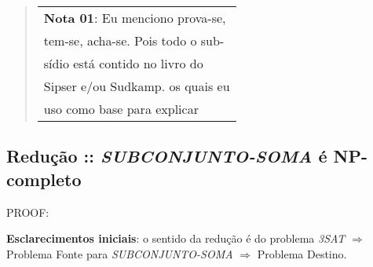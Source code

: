 \documentclass[12pt, a4paper]{article}
\begin{document}
\begin{quote}
  \flushright
    \begin{tabular}{|l}
    \textbf{Nota 01}: Eu menciono prova-se,\\
    tem-se, acha-se. Pois todo o sub-\\
    sídio está contido no livro do\\
    Sipser e/ou Sudkamp. os quais eu\\
    uso como base para explicar\\
  \end{tabular}
\end{quote}

\pagebreak
\subsection{Redução :: \textit{SUBCONJUNTO-SOMA} é \textbf{NP-completo}}

\begin{center}\begin{Huge}PROOF:\end{Huge}\end{center}

\textbf{Esclarecimentos iniciais}: o sentido da redução é do problema \textit{3SAT} $\Rightarrow$ Problema Fonte para \textit{SUBCONJUNTO-SOMA} $\Rightarrow$ Problema Destino.
\end{document}
